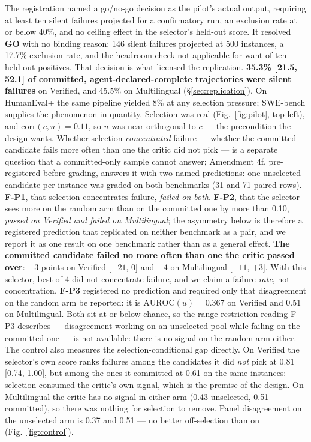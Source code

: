 \documentclass[11pt]{article}
\begin{document}
The registration named a go/no-go decision as the pilot's actual output, requiring at least ten silent failures projected for a confirmatory run, an exclusion rate at or below 40\%, and no ceiling effect in the selector's held-out score. It resolved \textbf{GO} with no binding reason: 146 silent failures projected at 500 instances, a 17.7\% exclusion rate, and the headroom check not applicable for want of ten held-out positives. That decision is what licensed the replication. \textbf{35.3\% [21.5, 52.1] of committed, agent-declared-complete trajectories were silent failures} on Verified, and 45.5\% on Multilingual (\S\ref{sec:replication}). On HumanEval+ the same pipeline yielded 8\% at any selection pressure; SWE-bench supplies the phenomenon in quantity. Selection was real (Fig.~\ref{fig:pilot}, top left), and $\mathrm{corr}(c,u)=0.11$, so $u$ was near-orthogonal to $c$ --- the precondition the design wants. Whether selection \emph{concentrated} failure --- whether the committed candidate fails more often than one the critic did not pick --- is a separate question that a committed-only sample cannot answer; Amendment 4f, pre-registered before grading, answers it with two named predictions: one unselected candidate per instance was graded on both benchmarks (31 and 71 paired rows). \textbf{F-P1}, that selection concentrates failure, \emph{failed on both}. \textbf{F-P2}, that the selector sees more on the random arm than on the committed one by more than 0.10, \emph{passed on Verified and failed on Multilingual}; the asymmetry below is therefore a registered prediction that replicated on neither benchmark as a pair, and we report it as one result on one benchmark rather than as a general effect. \textbf{The committed candidate failed no more often than one the critic passed over}: $-3$ points on Verified [$-21$, $0$] and $-4$ on Multilingual [$-11$, $+3$]. With this selector, best-of-4 did not concentrate failure, and we claim a failure \emph{rate}, not concentration. \textbf{F-P3} registered no prediction and required only that disagreement on the random arm be reported: it is $\mathrm{AUROC}(u) = 0.367$ on Verified and 0.51 on Multilingual. Both sit at or below chance, so the range-restriction reading F-P3 describes --- disagreement working on an unselected pool while failing on the committed one --- is not available: there is no signal on the random arm either. The control also measures the selection-conditional gap directly. On Verified the selector's own score ranks failures among the candidates it did \emph{not} pick at 0.81 [0.74, 1.00], but among the ones it committed at 0.61 on the same instances: selection consumed the critic's own signal, which is the premise of the design. On Multilingual the critic has no signal in either arm (0.43 unselected, 0.51 committed), so there was nothing for selection to remove. Panel disagreement on the unselected arm is 0.37 and 0.51 --- no better off-selection than on (Fig.~\ref{fig:control}).
\end{document}
